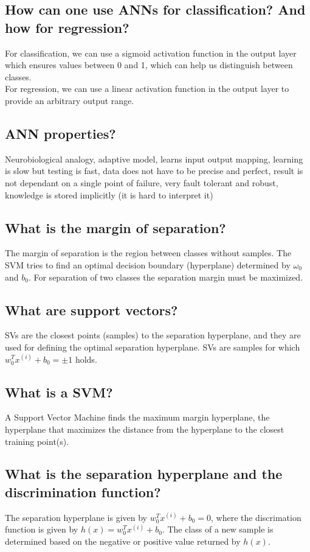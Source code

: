 \documentclass[12pt]{scrartcl}
\begin{document}
\subsection{How can one use ANNs for classification? And how for regression?}
For classification, we can use a sigmoid activation function in the output layer which ensures values between 0 and 1, which can help us distinguish between classes. \\
For regression, we can use a linear activation function in the output layer to provide an arbitrary output range.

\subsection{ANN properties?}
Neurobiological analogy, adaptive model, learns input output mapping, learning is slow but testing is fast, data does not have to be precise and perfect, result is not dependant on a single point of failure, very fault tolerant and robust, knowledge is stored implicitly (it is hard to interpret it)

\subsection{What is the margin of separation?}
The margin of separation is the region between classes without samples. The SVM tries to find an optimal decision boundary (hyperplane) determined by $\omega_0$ and $b_0$. For separation of two classes the separation margin must be maximized.

\subsection{What are support vectors?}
SVs are the closest points (samples) to the separation hyperplane, and they are used for defining the optimal separation hyperplane. SVs are samples for which $w_0^T x^{(i)} + b_0 = \pm 1$ holds.

\subsection{What is a SVM?}
A Support Vector Machine finds the maximum margin hyperplane, the hyperplane that maximizes the distance from the hyperplane to the closest training point(s).

\subsection{What is the separation hyperplane and the discrimination function?}
The separation hyperplane is given by $w_0^T x^{(i)} + b_0 = 0$, where the discrimation function is given by $h(x) = w_0^T x^{(i)} + b_0$. The class of a new sample is determined based on the negative or positive value returned by $h(x)$.
\end{document}
